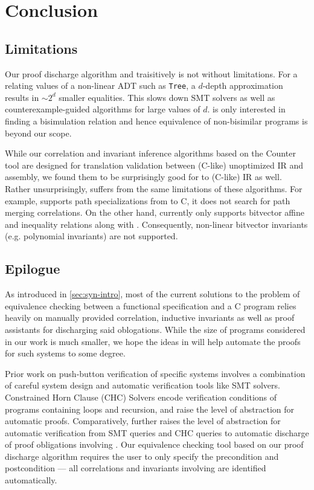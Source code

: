 \section{Conclusion}
\label{sec:syn-conclusion}

\subsection{Limitations}
\label{sec:syn-limitations}
Our proof discharge algorithm and traisitively \toolName{} is not without limitations.
For a \recursiveRelation{} relating values of a non-linear ADT such as {\tt Tree}, a $d$-depth
approximation results in $\sim 2^d$ smaller equalities. This slows down SMT solvers as well as
counterexample-guided algorithms for large values of $d$.
\toolName{} is only interested in finding a bisimulation relation and hence
equivalence of non-bisimilar programs is beyond our scope.

While our correlation and invariant inference algorithms based on the Counter tool \cite{oopsla20}
are designed for translation validation between (C-like) unoptimized IR and assembly, we found them
to be surprisingly good for \SpecL{} to (C-like) IR as well. Rather unsurprisingly, \toolName{}
suffers from the same limitations of these algorithms. For example, \toolName{} supports path
specializations from \SpecL{} to C, it does not search for path merging correlations.
On the other hand, \toolName{} currently only supports bitvector affine and inequality relations
along with \recursiveRelations{}. Consequently, non-linear bitvector
invariants (e.g. polynomial invariants) are not supported.

\subsection{Epilogue}
\label{sec:syn-epilogue}
As introduced in \cref{sec:syn-intro}, most of the current solutions
to the problem of equivalence checking between a functional specification
and a C program relies heavily on manually provided correlation, inductive
invariants as well as proof assistants for discharging said oblogations.
While the size of programs considered in our work is much smaller,
we hope the ideas in \toolName{} will help
automate the proofs for such systems to some degree.

Prior work on push-button verification of specific
systems \cite{fscq,hyperkernel,serval,verifiedBPF}
involves a combination of careful system design and
automatic verification tools like SMT solvers.
Constrained Horn Clause (CHC) Solvers \cite{CHCeq}
encode verification conditions of programs containing loops and recursion,
and raise the level of abstraction for automatic proofs.
Comparatively, \toolName{} further raises the level
of abstraction for automatic verification from
SMT queries and CHC queries to automatic discharge of
proof obligations involving \recursiveRelations{}.
Our equivalence checking tool based on
our proof discharge algorithm requires the user
to only specify the precondition and
postcondition --- all
correlations and invariants involving \recursiveRelations{}
are identified automatically.

